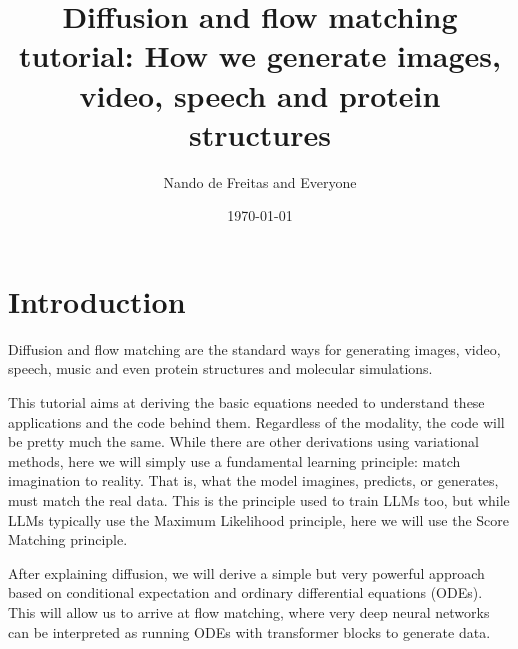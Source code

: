 \documentclass[usenames,dvipsnames]{article}
\title{Diffusion and flow matching tutorial: How we generate images, video, speech and protein structures}
\author{Nando de Freitas and Everyone}
\date{\today}
\begin{document}
\maketitle




\section{Introduction}

Diffusion and flow matching are the standard ways for generating images, video, speech, music and even protein structures and molecular simulations. 

This tutorial aims at deriving the basic equations needed to understand these applications and the code behind them. Regardless of the modality, the code will be pretty much the same. While there are other derivations using variational methods, here we will simply use a fundamental learning principle: match imagination to reality. That is, what the model imagines, predicts, or generates, must match the real data. This is the principle used to train LLMs too, but while LLMs typically use the Maximum Likelihood principle, here we will use the Score Matching principle. 

After explaining diffusion, we will derive a simple but very powerful approach based on conditional expectation and ordinary differential equations (ODEs). This will allow us to arrive at flow matching, where very deep neural networks can be interpreted as running ODEs with transformer blocks to generate data.
\end{document}

